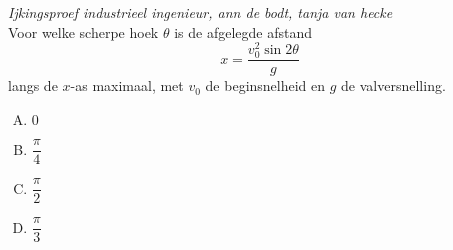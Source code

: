 \documentclass[12pt,twoside,a4paper]{article}
\begin{document}
\begin{oefening}
{\em \scriptsize Ijkingsproef industrieel ingenieur, ann de bodt, tanja van hecke}\\
Voor welke scherpe hoek $\theta$ is de afgelegde afstand
$$x=\dfrac{v^2_0 \sin 2\theta}{g}$$
langs de $x$-as maximaal, met $v_0$ de beginsnelheid en $g$ de valversnelling.
\begin{enumerate}[(A)]
  \itemsep.3em
  \item $0$
  \item $\dfrac{\pi}{4}$
  \item $\dfrac{\pi}{2}$
  \item $\dfrac{\pi}{3}$
\end{enumerate}
\end{oefening}
\end{document}
